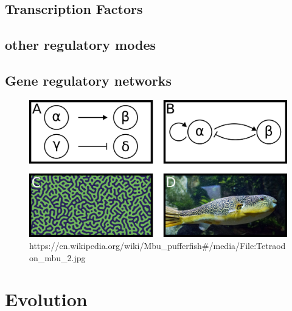 \subsection{Transcription Factors}


\subsection{other regulatory modes}
\subsection{Gene regulatory networks}

\begin{figure}[H]
    \includegraphics[width=\linewidth]{ch1.Introduction/imgs/network.png}
    \caption{https://en.wikipedia.org/wiki/Mbu\_pufferfish\#/media/File:Tetraodon\_mbu\_2.jpg}
    \label{fig:network}
\end{figure}

\section{Evolution}

